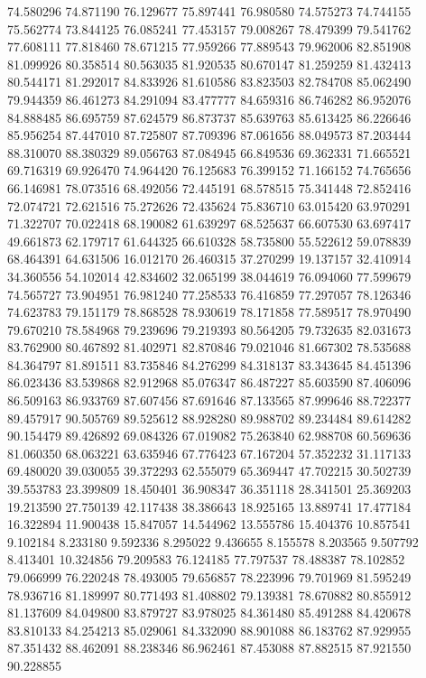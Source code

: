 74.580296
74.871190
76.129677
75.897441
76.980580
74.575273
74.744155
75.562774
73.844125
76.085241
77.453157
79.008267
78.479399
79.541762
77.608111
77.818460
78.671215
77.959266
77.889543
79.962006
82.851908
81.099926
80.358514
80.563035
81.920535
80.670147
81.259259
81.432413
80.544171
81.292017
84.833926
81.610586
83.823503
82.784708
85.062490
79.944359
86.461273
84.291094
83.477777
84.659316
86.746282
86.952076
84.888485
86.695759
87.624579
86.873737
85.639763
85.613425
86.226646
85.956254
87.447010
87.725807
87.709396
87.061656
88.049573
87.203444
88.310070
88.380329
89.056763
87.084945
66.849536
69.362331
71.665521
69.716319
69.926470
74.964420
76.125683
76.399152
71.166152
74.765656
66.146981
78.073516
68.492056
72.445191
68.578515
75.341448
72.852416
72.074721
72.621516
75.272626
72.435624
75.836710
63.015420
63.970291
71.322707
70.022418
68.190082
61.639297
68.525637
66.607530
63.697417
49.661873
62.179717
61.644325
66.610328
58.735800
55.522612
59.078839
68.464391
64.631506
16.012170
26.460315
37.270299
19.137157
32.410914
34.360556
54.102014
42.834602
32.065199
38.044619
76.094060
77.599679
74.565727
73.904951
76.981240
77.258533
76.416859
77.297057
78.126346
74.623783
79.151179
78.868528
78.930619
78.171858
77.589517
78.970490
79.670210
78.584968
79.239696
79.219393
80.564205
79.732635
82.031673
83.762900
80.467892
81.402971
82.870846
79.021046
81.667302
78.535688
84.364797
81.891511
83.735846
84.276299
84.318137
83.343645
84.451396
86.023436
83.539868
82.912968
85.076347
86.487227
85.603590
87.406096
86.509163
86.933769
87.607456
87.691646
87.133565
87.999646
88.722377
89.457917
90.505769
89.525612
88.928280
89.988702
89.234484
89.614282
90.154479
89.426892
69.084326
67.019082
75.263840
62.988708
60.569636
81.060350
68.063221
63.635946
67.776423
67.167204
57.352232
31.117133
69.480020
39.030055
39.372293
62.555079
65.369447
47.702215
30.502739
39.553783
23.399809
18.450401
36.908347
36.351118
28.341501
25.369203
19.213590
27.750139
42.117438
38.386643
18.925165
13.889741
17.477184
16.322894
11.900438
15.847057
14.544962
13.555786
15.404376
10.857541
9.102184
8.233180
9.592336
8.295022
9.436655
8.155578
8.203565
9.507792
8.413401
10.324856
79.209583
76.124185
77.797537
78.488387
78.102852
79.066999
76.220248
78.493005
79.656857
78.223996
79.701969
81.595249
78.936716
81.189997
80.771493
81.408802
79.139381
78.670882
80.855912
81.137609
84.049800
83.879727
83.978025
84.361480
85.491288
84.420678
83.810133
84.254213
85.029061
84.332090
88.901088
86.183762
87.929955
87.351432
88.462091
88.238346
86.962461
87.453088
87.882515
87.921550
90.228855
